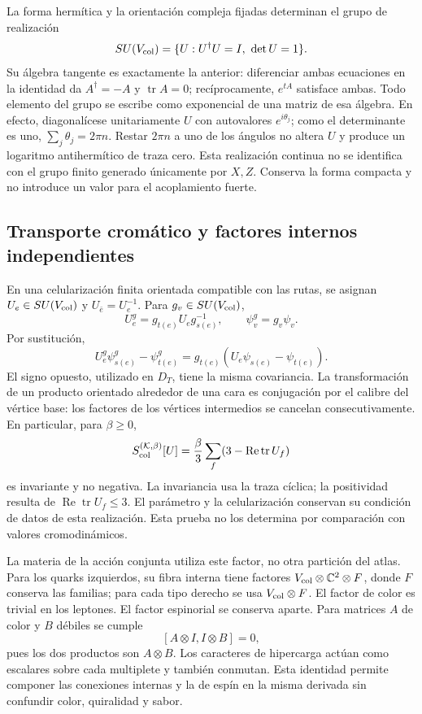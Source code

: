 La forma hermítica y la orientación compleja fijadas determinan el
grupo de realización
\[
 SU(V_{\rm col})=\{U:U^{\dagger}U=I,\ \det U=1\}.
\]
Su álgebra tangente es exactamente la anterior: diferenciar ambas
ecuaciones en la identidad da \(A^{\dagger}=-A\) y
\(\operatorname{tr}A=0\); recíprocamente, \(e^{tA}\) satisface
ambas. Todo elemento del grupo se escribe como exponencial de una
matriz de esa álgebra. En efecto, diagonalícese unitariamente \(U\)
con autovalores \(e^{i\theta_j}\); como el determinante es uno,
\(\sum_j\theta_j=2\pi n\). Restar \(2\pi n\) a uno de los
ángulos no altera \(U\) y produce un logaritmo antihermítico de
traza cero. Esta realización continua no se identifica con el grupo
finito generado únicamente por \(X,Z\). Conserva la forma compacta
y no introduce un valor para el acoplamiento fuerte.

\subsection{Transporte cromático y factores internos independientes}
\label{hmtcuatro:color:transporte}

En una celularización finita orientada compatible con las rutas,
se asignan \(U_e\in SU(V_{\rm col})\) y
\(U_{\bar e}=U_e^{-1}\). Para \(g_v\in SU(V_{\rm col})\),
\[
 U_e^g=g_{t(e)}U_eg_{s(e)}^{-1},\qquad
 \psi_v^g=g_v\psi_v.
\]
Por sustitución,
\[
 U_e^g\psi_{s(e)}^g-\psi_{t(e)}^g
 =g_{t(e)}(U_e\psi_{s(e)}-\psi_{t(e)}).
\]
El signo opuesto, utilizado en \(D_T\), tiene la misma covariancia.
La transformación de un producto orientado alrededor de una cara
es conjugación por el calibre del vértice base: los factores de
los vértices intermedios se cancelan consecutivamente. En particular,
para \(\beta\ge0\),
\[
 S_{\rm col}^{(\mathcal K,\beta)}[U]
 =\frac\beta3\sum_f(3-\operatorname{Re}\operatorname{tr}U_f)
\]
es invariante y no negativa. La invariancia usa la traza cíclica;
la positividad resulta de \(\operatorname{Re}\operatorname{tr}U_f\le3\).
El parámetro y la celularización conservan su condición de datos de
esta realización. Esta prueba no los determina por comparación con
valores cromodinámicos.

La materia de la acción conjunta utiliza este factor, no otra
partición del atlas. Para los quarks izquierdos, su fibra interna
tiene factores \(V_{\rm col}\otimes\mathbb C^2\otimes F\),
donde \(F\) conserva las familias; para cada tipo derecho se usa
\(V_{\rm col}\otimes F\). El factor de color es trivial en los
leptones. El factor espinorial se conserva aparte. Para matrices
\(A\) de color y \(B\) débiles se cumple
\[
 [A\otimes I,I\otimes B]=0,
\]
pues los dos productos son \(A\otimes B\). Los caracteres de
hipercarga actúan como escalares sobre cada multiplete y también
conmutan. Esta identidad permite componer las conexiones internas
y la de espín en la misma derivada sin confundir color, quiralidad
y sabor.

